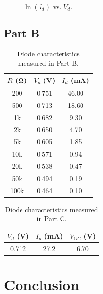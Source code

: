 \documentclass{article}
\begin{document}
\begin{figure}[hbtp]
  \begin{center}
    
  \end{center}
  \caption{\label{fig:part_a_graph2} $\ln{(I_d)}$ vs. $V_d$.}
\end{figure}

\subsection{Part B}
\label{sec:result_b}

\begin{table}[hbtp]
  \begin{center}
    \begin{tabular}{ccc}
      $R$ (\si{\ohm}) & $V_d$ (\si{V}) & $I_d$ (\si{mA}) \\
      \hline
      200 & 0.751 & 46.00 \\
      500 & 0.713 & 18.60 \\
      1k & 0.682 & 9.30 \\
      2k & 0.650 & 4.70 \\
      5k & 0.605 & 1.85 \\
      10k & 0.571 & 0.94 \\
      20k & 0.538 & 0.47 \\
      50k & 0.494 & 0.19 \\
      100k & 0.464 & 0.10 \\
    \end{tabular}
  \end{center}
  \caption{\label{tab:part_b} Diode characteristics measured in Part B.}
\end{table}

\begin{table}[hbtp]
  \begin{center}
    \begin{tabular}{ccc}
      $V_d$ (\si{V}) & $I_d$ (\si{mA}) & $V_{OC}$ (\si{V}) \\
      \hline
      0.712 & 27.2 & 6.70 \\
    \end{tabular}
  \end{center}
  \caption{\label{tab:part_b} Diode characteristics measured in Part C.}
\end{table}

\section{Conclusion}
\label{sec:conclusion}
\end{document}
